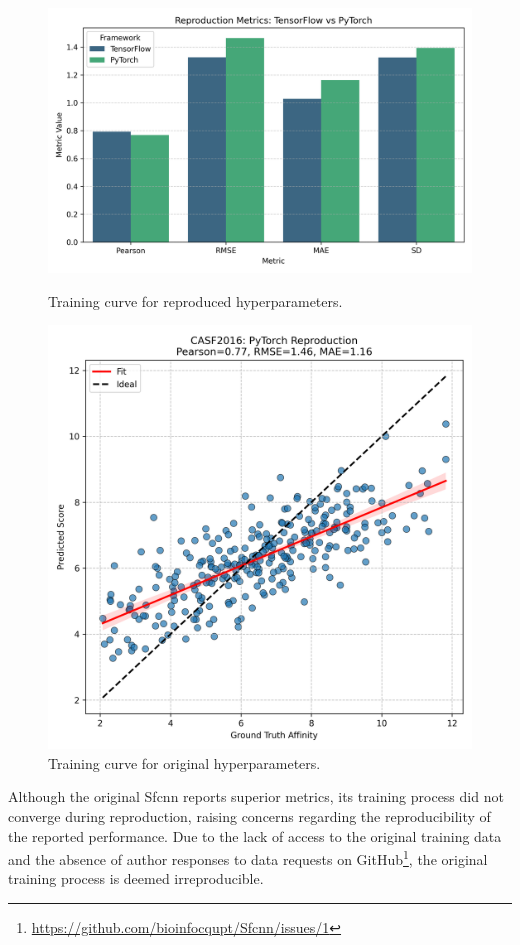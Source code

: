 \documentclass[unnumsec,webpdf,contemporary,large]{oup-authoring-template}
\theoremstyle{thmstyleone}%
\theoremstyle{thmstyletwo}%
\theoremstyle{thmstylethree}%
\begin{document}
\begin{figure}[H]
    \centering
    \begin{minipage}{0.4\textwidth}
        \centering
        \includegraphics[width=\textwidth]{images/reproduction_metrics_comparison_seaborn.png}
        \caption{Training curve for reproduced hyperparameters.}
        \label{fig:ReproducedPlot}
    \end{minipage}\hfill
    \begin{minipage}{0.4\textwidth}
        \centering
        \includegraphics[width=\textwidth]{images/reproduction_scatter_seaborn.png}
        \caption{Training curve for original hyperparameters.}
        \label{fig:OriginalPlot}
    \end{minipage}
\end{figure}
Although the original Sfcnn reports superior metrics, its training process did not converge during reproduction, raising concerns regarding the reproducibility of the reported performance. 
Due to the lack of access to the original training data and the absence of author responses to data requests on GitHub\footnote{\url{https://github.com/bioinfocqupt/Sfcnn/issues/1}}, the original training process is deemed irreproducible.
\end{document}
